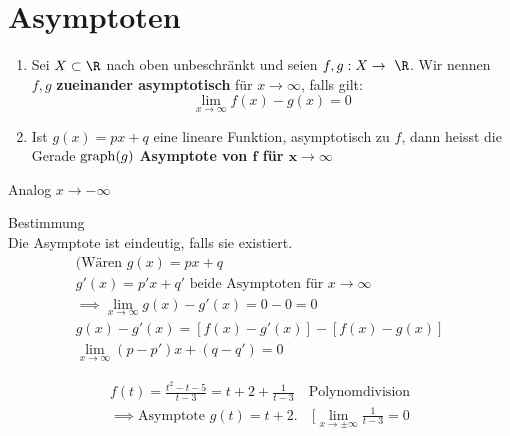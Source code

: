 \section{Asymptoten}
\begin{def*}[note = Asymptote , index = Asymptote]
	\begin{enumerate}[label = \alph*)]
		\item Sei $X \subset \R$ nach oben unbeschränkt und seien $f, g : X \rightarrow \R$. Wir nennen $f, g$ \textbf{zueinander asymptotisch} für $x \rightarrow \infty$, falls gilt:
			\[ \lim_{x \rightarrow \infty} f(x) - g(x) = 0 \]
		\item Ist $g(x) = px + q$ eine lineare Funktion, asymptotisch zu $f$, dann heisst die Gerade $\operatorname{graph}(g)$ \textbf{Asymptote von $\mathbf{f}$ für $\mathbf{x \rightarrow \infty}$}
	\end{enumerate}
	Analog $x \rightarrow -\infty$
	
	Bestimmung \\
	Die Asymptote ist eindeutig, falls sie existiert.\\
	\begin{gather*}
		(\text{Wären } g(x) = px + q \\
		g'(x) = p'x + q' \text{ beide Asymptoten für } x \rightarrow \infty \\
		\implies \lim_{x \rightarrow \infty} g(x) - g'(x) = 0 - 0 = 0 \\
		g(x) - g'(x) = [f(x) - g'(x)] - [f(x) - g(x)] \\
		\lim_{x \rightarrow \infty} (p - p') x + (q - q') = 0
	\end{gather*}
\end{def*}
\begin{bsp*}
	\begin{gather*}
		f(t) = \frac{t^2 - t - 5}{t-3} = t + 2 + \frac{1}{t-3} \quad \text{Polynomdivision} \\
		\implies \text{Asymptote } g(t) = t + 2 . \quad [ \lim_{x \rightarrow \pm \infty} \frac{1}{t-3} = 0
	\end{gather*}
\end{bsp*}
